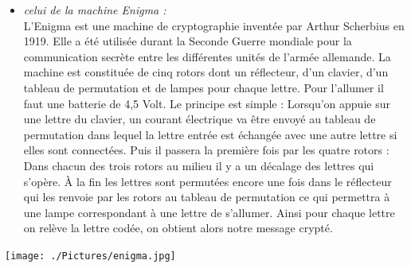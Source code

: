 \documentclass[a4paper,12pt,abstracton,titlepage]{scrartcl}
\begin{document}
\begin{minipage}[t]{0.5\textwidth}
    \begin{itemize}
    \item \textit{celui de la machine Enigma :}\\
    L'Enigma est une machine de cryptographie inventée par Arthur Scherbius en 1919. Elle a été utilisée durant la Seconde Guerre mondiale pour la communication secrète entre les différentes unités de l'armée allemande.
La machine est constituée de cinq rotors dont un réflecteur, d'un clavier, d'un tableau de permutation et de lampes pour chaque lettre. Pour l'allumer il faut une batterie de 4,5 Volt.
Le principe est simple : Lorsqu'on appuie sur une lettre du clavier, un courant électrique va être envoyé au tableau de permutation dans lequel la lettre entrée est échangée avec une autre lettre si elles sont connectées. Puis il passera la première fois par les quatre rotors : Dans chacun des trois rotors au milieu il y a un décalage des lettres qui s'opère. À la fin les lettres sont permutées encore une fois dans le réflecteur qui les renvoie par les rotors au tableau de permutation ce qui permettra à une lampe correspondant à une lettre de s'allumer. Ainsi pour chaque lettre on relève la lettre codée, on obtient alors notre message crypté.\\
    \end{itemize}
  \end{minipage}
  \begin{minipage}[t]{0.5\linewidth}
    \raggedleft
    \strut\vspace*{-\baselineskip}\newline\newline\newline\texttt{[image: ./Pictures/enigma.jpg]}
    \label{enigma}
  \end{minipage}
  
\paragraph{}
\paragraph{}
\paragraph{}
\paragraph{}
\end{document}
